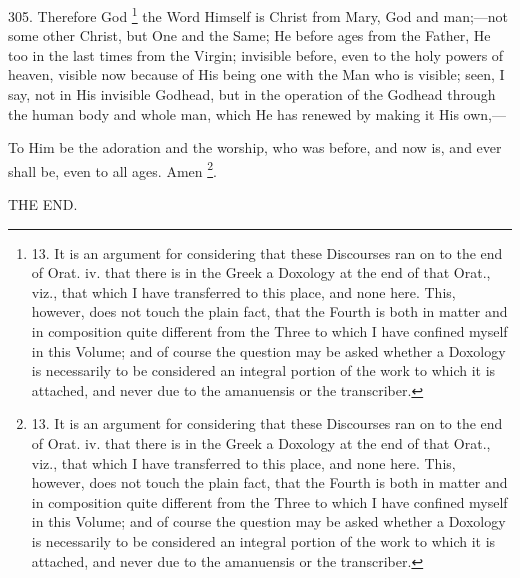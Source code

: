 305.
Therefore God \footnote{13. It is an argument
for considering that these Discourses ran on to the end of Orat. iv.
that there is in the Greek a Doxology at the end of that Orat., viz.,
that which I have transferred to this place, and none here. This,
however, does not touch the plain fact, that the Fourth is both in
matter and in composition quite different from the Three to which I
have confined myself in this Volume; and of course the question may be
asked whether a Doxology is necessarily to be considered an integral
portion of the work to which it is attached, and never due to the
amanuensis or the transcriber.} the Word
Himself is Christ from Mary, God and man;—not some other Christ, but
One and the Same; He before ages from the Father, He too in the last
times from the Virgin; invisible before, even to the holy powers of
heaven, visible now because of His being one with the Man who is
visible; seen, I say, not in His invisible Godhead, but in the
operation of the Godhead through the human body and whole man, which
He has renewed by making it His own,—

To
Him be the adoration and the worship, who was before, and now is, and
ever shall be, even to all ages. Amen \footnote{13. It is an argument
for considering that these Discourses ran on to the end of Orat. iv.
that there is in the Greek a Doxology at the end of that Orat., viz.,
that which I have transferred to this place, and none here. This,
however, does not touch the plain fact, that the Fourth is both in
matter and in composition quite different from the Three to which I
have confined myself in this Volume; and of course the question may be
asked whether a Doxology is necessarily to be considered an integral
portion of the work to which it is attached, and never due to the
amanuensis or the transcriber.}.

THE
END.
